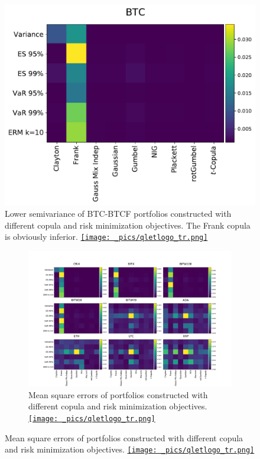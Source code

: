 \begin{figure}[th]
    \centering
    \includegraphics[width=\textwidth]{_pics/semiLowerVariance_BTC.pdf}
  \caption{Lower semivariance of BTC-BTCF portfolios constructed with different copula and risk minimization objectives.
  The Frank copula is obviously inferior.
  \href{http://www.quantlet.com/}{\texttt{[image: \_pics/qletlogo\_tr.png]}} }
\label{fig:SLV_BTC}
\end{figure}

\begin{figure}[!]
\begin{subfigure}{\textwidth}\centering
        \centering
        \includegraphics[width=\textwidth]{_pics/MSE_other.pdf}
      \caption{Mean square errors of portfolios constructed with different copula and risk minimization objectives.
      \href{http://www.quantlet.com/}{\texttt{[image: \_pics/qletlogo\_tr.png]}} }
    \label{fig:MSE_other}
\end{subfigure}%
\end{figure}

